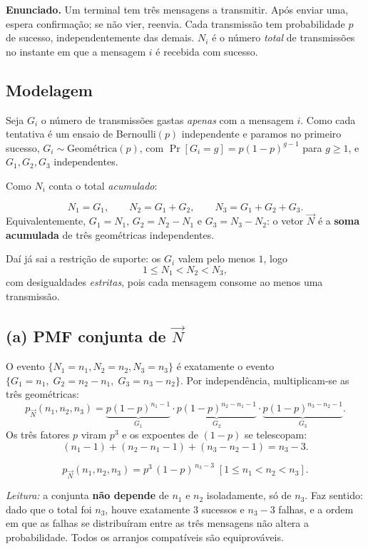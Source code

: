 \documentclass[11pt,a4paper]{article}
\newcommand{\Ind}[1]{\left[#1\right]}
\renewcommand{\Pr}{\operatorname{Pr}}
\begin{document}
\textbf{Enunciado.} Um terminal tem três mensagens a transmitir. Após enviar uma,
espera confirmação; se não vier, reenvia. Cada transmissão tem probabilidade $p$
de sucesso, independentemente das demais. $N_i$ é o número \emph{total} de
transmissões no instante em que a mensagem $i$ é recebida com sucesso.

\subsection*{Modelagem}

Seja $G_i$ o número de transmissões gastas \emph{apenas} com a mensagem $i$.
Como cada tentativa é um ensaio de Bernoulli$(p)$ independente e paramos no
primeiro sucesso, $G_i\sim\text{Geométrica}(p)$, com
$\Pr[G_i=g]=p(1-p)^{g-1}$ para $g\ge1$, e $G_1,G_2,G_3$ independentes.

Como $N_i$ conta o total \emph{acumulado}:
\begin{resp}
\[
N_1=G_1,\qquad N_2=G_1+G_2,\qquad N_3=G_1+G_2+G_3 .
\]
Equivalentemente, $G_1=N_1$, $G_2=N_2-N_1$ e $G_3=N_3-N_2$: o vetor $\vec N$ é a
\textbf{soma acumulada} de três geométricas independentes.
\end{resp}

Daí já sai a restrição de suporte: os $G_i$ valem pelo menos $1$, logo
\[
1\le N_1<N_2<N_3 ,
\]
com desigualdades \emph{estritas}, pois cada mensagem consome ao menos uma
transmissão.

\subsection*{(a) PMF conjunta de $\vec N$}

O evento $\{N_1=n_1, N_2=n_2, N_3=n_3\}$ é exatamente o evento
$\{G_1=n_1,\; G_2=n_2-n_1,\; G_3=n_3-n_2\}$. Por independência, multiplicam-se as
três geométricas:
\[
p_{\vec N}(n_1,n_2,n_3)
= \underbrace{p(1-p)^{n_1-1}}_{G_1}
\cdot \underbrace{p(1-p)^{n_2-n_1-1}}_{G_2}
\cdot \underbrace{p(1-p)^{n_3-n_2-1}}_{G_3}.
\]
Os três fatores $p$ viram $p^3$ e os expoentes de $(1-p)$ se telescopam:
\[
(n_1-1)+(n_2-n_1-1)+(n_3-n_2-1) = n_3-3 .
\]

\begin{resp}
\[
p_{\vec N}(n_1,n_2,n_3)=p^3\,(1-p)^{\,n_3-3}\;\Ind{1\le n_1<n_2<n_3}.
\]
\end{resp}

\emph{Leitura:} a conjunta \textbf{não depende} de $n_1$ e $n_2$ isoladamente, só
de $n_3$. Faz sentido: dado que o total foi $n_3$, houve exatamente $3$ sucessos e
$n_3-3$ falhas, e a ordem em que as falhas se distribuíram entre as três mensagens
não altera a probabilidade. Todos os arranjos compatíveis são equiprováveis.
\end{document}
